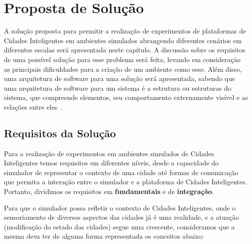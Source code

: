 \chapter{Proposta de Solução}
\label{cap:proposta}

A solução proposta para permitir a realização de experimentos de plataformas de Cidades Inteligentes em ambientes simulados abrangendo diferentes cenários em diferentes escalas será
apresentada neste capítulo.
A discussão sobre os requisitos de uma possível solução para esse problema será feita, levando em consideração as principais dificuldades para a criação de um ambiente como esse.
Além disso, uma arquitetura de software para uma solução será apresentada, sabendo que uma arquitetura de software para um sistema é a estrutura ou estruturas do sistema, que compreende elementos,
seu comportamento externamente visível e as relações entre eles~\cite{clements_2002}.

\section{Requisitos da Solução}
\label{sec:requisitos}

Para a realização de experimentos em ambientes simulados de Cidades Inteligentes temos requisitos em diferentes níveis, desde a capacidade do simulador de representar o contexto
de uma cidade até formas de comunicação que permita a interação entre o simulador e a plataforma de Cidades Inteligentes.
Portanto, dividimos os requisitos em \textbf{fundamentais} e de \textbf{integração}.

Para que o simulador possa refletir o contexto de Cidades Inteligentes, onde o sensoriamento de diversos aspectos das cidades já é uma realidade, e a atuação (modificação do estado
das cidades) segue uma crescente, consideramos que a mesma deva ter de alguma forma representada os conceitos abaixo:

